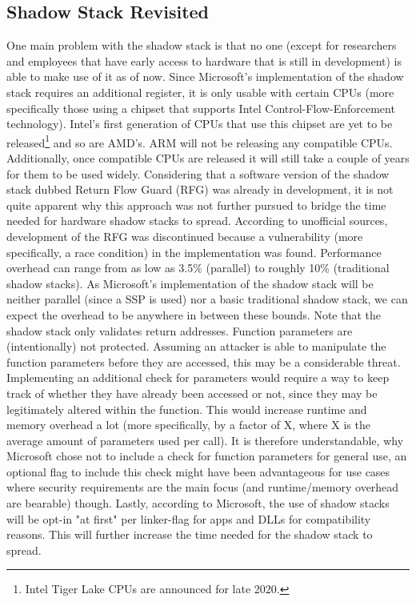 \documentclass[10pt,twocolumn,a4paper]{article}
\begin{document}
\subsection{Shadow Stack Revisited}
One main problem with the shadow stack is that no one (except for researchers and employees that have early access to hardware that is still in development) is able to make use of it as of now. Since Microsoft's implementation of the shadow stack requires an additional register, it is only usable with certain CPUs (more specifically those using a chipset that supports Intel Control-Flow-Enforcement technology)\cite{CFE}.
Intel's first generation of CPUs that use this chipset are yet to be released\footnote{Intel Tiger Lake CPUs are announced for late 2020.} and so are AMD's.
\newline ARM will not be releasing any compatible CPUs\cite{techrepublic}.
Additionally, once compatible CPUs are released it will still take a couple of years for them to be used widely.
Considering that a software version of the shadow stack dubbed Return Flow Guard (RFG)\cite{RFG} was already in development, it is not quite apparent why this approach was not further pursued to bridge the time needed for hardware shadow stacks to spread.
According to unofficial sources, development of the RFG was discontinued because a vulnerability (more specifically, a race condition) in the implementation was found\cite{techrepublic}.
Performance overhead can range from as low as 3.5\% (parallel) to roughly 10\% (traditional shadow stacks)\cite{performance}. As Microsoft's implementation of the shadow stack will be neither parallel (since a SSP is used) nor a basic traditional shadow stack, we can expect the overhead to be anywhere in between these bounds.
Note that the shadow stack only validates return addresses. Function parameters are (intentionally) not protected\cite{SS}.
Assuming an attacker is able to manipulate the function parameters before they are accessed, this may be a considerable threat. Implementing an additional check for parameters would require a way to keep track of whether they have already been accessed or not, since they may be legitimately altered within the function.
This would increase runtime and memory overhead a lot (more specifically, by a factor of X, where X is the average amount of parameters used per call).
It is therefore understandable, why Microsoft chose not to include a check for function parameters for general use, an optional flag to include this check might have been advantageous for use cases where security requirements are the main focus (and runtime/memory overhead are bearable) though.
Lastly, according to Microsoft, the use of shadow stacks will be opt-in "at first" per linker-flag for apps and DLLs for compatibility reasons\cite{SS}. This will further increase the time needed for the shadow stack to spread.
\end{document}
